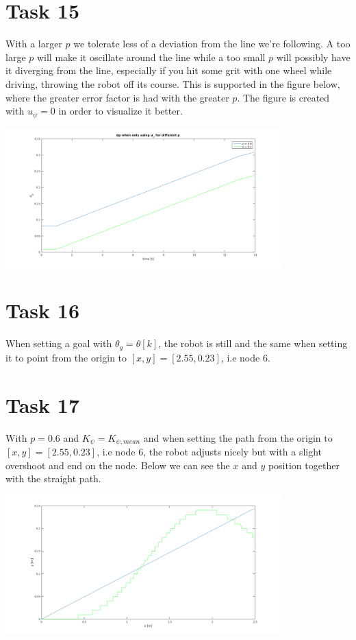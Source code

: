 \documentclass[a4paper,12pt,oneside,onecolumn]{article} %
\begin{document}
\section*{Task 15}

With a larger $p$ we tolerate less of a deviation from the line we're following. A too large $p$ will make it oscillate around the line while a too small $p$ will possibly have it diverging from the line, especially if you hit some grit with one wheel while driving, throwing the robot off its course. This is supported in the figure below, where the greater error factor is had with the greater $p$. The figure is created with $u_\psi = 0$ in order to visualize it better.


\begin{center}
  \includegraphics[width = 0.8\textwidth]{task15.png}
 \end{center}

\section*{Task 16}

When setting a goal with $\theta_g = \theta[k]$, the robot is still and the same when setting it to point from the origin to $[x,y] = [2.55, 0.23]$, i.e node 6.


\section*{Task 17}

With $p = 0.6$ and $K_\psi = K_{\psi,mean}$ and when setting the path from the origin to $[x,y] = [2.55, 0.23]$, i.e node 6, the robot adjusts nicely but with a slight overshoot and end on the node. Below we can see the $x$ and $y$ position together with the straight path.

\begin{center}
  \includegraphics[width = 0.8\textwidth]{task17_spatial.png}
 \end{center}
\end{document}
